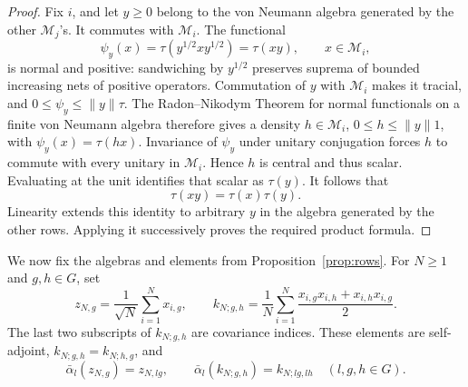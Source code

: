 \begin{proof}
Fix \(i\), and let \(y\geq0\) belong to the von Neumann algebra
generated by the other \(\mathcal M_j\)'s. It commutes with
\(\mathcal M_i\). The functional
\[
 \psi_y(x)=\tau(y^{1/2}xy^{1/2})=\tau(xy),
 \qquad x\in\mathcal M_i,
\]
is normal and positive: sandwiching by \(y^{1/2}\) preserves
suprema of bounded increasing nets of positive operators.
Commutation of \(y\) with \(\mathcal M_i\) makes it tracial,
and \(0\leq\psi_y\leq\|y\|\tau\).
The Radon--Nikodym Theorem for normal functionals on a finite
von Neumann algebra therefore gives a density
\(h\in\mathcal M_i\), \(0\leq h\leq\|y\|1\), with
\(\psi_y(x)=\tau(hx)\). Invariance of \(\psi_y\) under unitary
conjugation forces \(h\) to commute with every unitary in
\(\mathcal M_i\). Hence \(h\) is central and thus scalar.
Evaluating at the unit identifies that scalar as \(\tau(y)\).
It follows that
\[
 \tau(xy)=\tau(x)\tau(y).
\]
Linearity extends this identity to arbitrary \(y\) in the
algebra generated by the other rows. Applying it successively
proves the required product formula.
\end{proof}

We now fix the algebras and elements from
Proposition~\ref{prop:rows}. For \(N\geq1\) and \(g,h\in G\), set
\begin{equation}
\label{eq:empirical-variables}
 z_{N,g}=\frac1{\sqrt N}\sum_{i=1}^N x_{i,g},
 \qquad
 k_{N;g,h}=\frac1N\sum_{i=1}^N
 \frac{x_{i,g}x_{i,h}+x_{i,h}x_{i,g}}2.
\end{equation}
The last two subscripts of \(k_{N;g,h}\) are covariance indices.
These elements are self-adjoint, \(k_{N;g,h}=k_{N;h,g}\), and
\begin{equation}
\label{eq:empirical-equivariance}
 \bar\alpha_l(z_{N,g})=z_{N,lg},
 \qquad
 \bar\alpha_l(k_{N;g,h})=k_{N;lg,lh}
 \quad(l,g,h\in G).
\end{equation}

